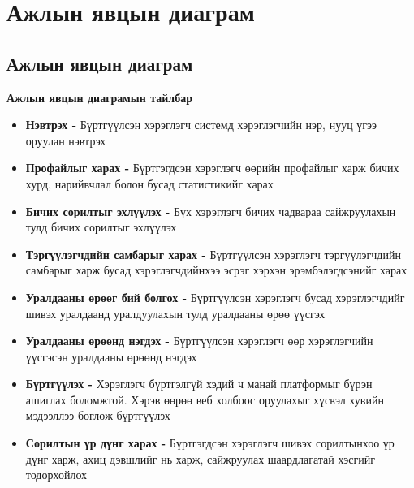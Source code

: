 




\pagebreak
\section{Ажлын явцын диаграм}

\subsection{Ажлын явцын диаграм}

\textbf{Ажлын явцын диаграмын тайлбар}

\begin{itemize}
	\item \textbf{Нэвтрэх -} Бүртгүүлсэн хэрэглэгч системд хэрэглэгчийн нэр, нууц үгээ оруулан нэвтрэх
	\item \textbf{Профайлыг харах -} Бүртгэгдсэн хэрэглэгч өөрийн профайлыг харж бичих хурд, нарийвчлал болон бусад статистикийг харах
	\item \textbf{Бичих сорилтыг эхлүүлэх -} Бүх хэрэглэгч бичих чадвараа сайжруулахын тулд бичих сорилтыг эхлүүлэх
	\item \textbf{Тэргүүлэгчдийн самбарыг харах -} Бүртгүүлсэн хэрэглэгч тэргүүлэгчдийн самбарыг харж бусад хэрэглэгчдийнхээ эсрэг хэрхэн эрэмбэлэгдсэнийг харах
	\item \textbf{Уралдааны өрөөг бий болгох -} Бүртгүүлсэн хэрэглэгч бусад хэрэглэгчдийг шивэх уралдаанд уралдуулахын тулд уралдааны өрөө үүсгэх
	\item \textbf{Уралдааны өрөөнд нэгдэх -} Бүртгүүлсэн хэрэглэгч өөр хэрэглэгчийн үүсгэсэн уралдааны өрөөнд нэгдэх
	\item \textbf{Бүртгүүлэх -} Хэрэглэгч бүртгэлгүй хэдий ч манай платформыг бүрэн ашиглах боломжтой. Хэрэв өөрөө веб холбоос оруулахыг хүсвэл хувийн мэдээллээ бөглөж бүртгүүлэх
	\item \textbf{Сорилтын үр дүнг харах -} Бүртгэгдсэн хэрэглэгч шивэх сорилтынхоо үр дүнг харж, ахиц дэвшлийг нь харж, сайжруулах шаардлагатай хэсгийг тодорхойлох
\end{itemize}

